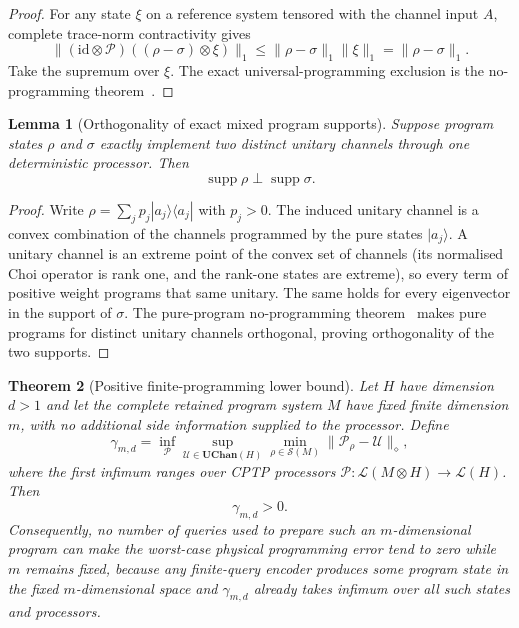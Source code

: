 \documentclass[11pt,a4paper]{article}
\theoremstyle{definition}
\theoremstyle{plain}
\newtheorem{theorem}{Theorem}[section]
\newtheorem{lemma}[theorem]{Lemma}
\theoremstyle{remark}
\newcommand{\Lin}{\mathcal L}
\newcommand{\UChan}{\mathbf{UChan}}
\newcommand{\Sstate}{\mathcal{S}}
\newcommand{\id}{\mathrm{id}}
\begin{document}
\begin{proof}
For any state $\xi$ on a reference system tensored with the channel input
$A$, complete trace-norm contractivity gives
\[
\|(\id\otimes\mathcal P)((\rho-\sigma)\otimes\xi)\|_1
\leq\|\rho-\sigma\|_1\|\xi\|_1
=\|\rho-\sigma\|_1.
\]
Take the supremum over $\xi$. The exact universal-programming exclusion is
the no-programming theorem~\cite{NielsenChuang1997}.
\end{proof}

\begin{lemma}[Orthogonality of exact mixed program supports]
\label{lem:mixed-no-programming}
Suppose program states $\rho$ and $\sigma$ exactly implement two distinct
unitary channels through one deterministic processor. Then
\[
\operatorname{supp}\rho\perp\operatorname{supp}\sigma.
\]
\end{lemma}

\begin{proof}
Write $\rho=\sum_jp_j|a_j\rangle\langle a_j|$ with $p_j>0$. The induced
unitary channel is a convex combination of the channels programmed by the
pure states $|a_j\rangle$. A unitary channel is an extreme point of the convex set of
channels (its normalised Choi operator is rank one, and the rank-one states
are extreme), so every term of positive weight programs that same unitary.
The same holds for every eigenvector in the support of $\sigma$. The
pure-program no-programming theorem~\cite{NielsenChuang1997} makes pure
programs for distinct unitary channels orthogonal, proving orthogonality of
the two supports.
\end{proof}

\begin{theorem}[Positive finite-programming lower bound]
\label{thm:physical-programming-floor}
Let $H$ have dimension $d>1$ and let the complete retained program system
$M$ have fixed finite dimension $m$, with no additional side information
supplied to the processor. Define
\[
\gamma_{m,d}
=
\inf_{\mathcal P}
\sup_{\mathcal U\in\UChan(H)}
\min_{\rho\in\Sstate(M)}
\|\mathcal P_\rho-\mathcal U\|_\diamond,
\]
where the first infimum ranges over CPTP processors
$\mathcal P:\Lin(M\otimes H)\to\Lin(H)$. Then
\[
\gamma_{m,d}>0.
\]
Consequently, no number of queries used to prepare such an $m$-dimensional
program can make the worst-case physical programming error tend to zero while
$m$ remains fixed, because any finite-query encoder produces some program state in the fixed $m$-dimensional space and $\gamma_{m,d}$ already takes infimum over all such states and processors.
\end{theorem}
\end{document}
